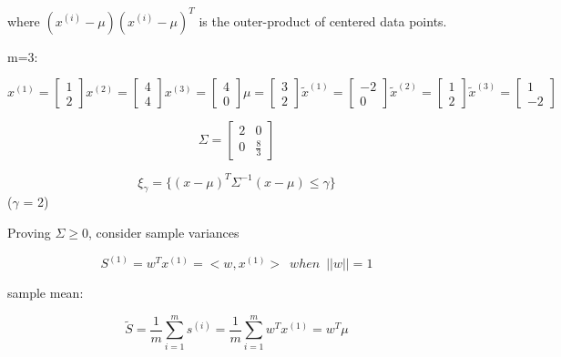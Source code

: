 where $(x^{(i)}-\mu)(x^{(i)}-\mu)^T$ is the outer-product of centered data points.

m=3:

$$x^{(1)} =
\left[
\begin{matrix}
1\\
2
\end{matrix}
\right]x^{(2)} =
\left[
\begin{matrix}
4\\
4
\end{matrix}
\right]x^{(3)} =
\left[
\begin{matrix}
4\\
0
\end{matrix}
\right]\mu =
\left[
\begin{matrix}
3\\
2
\end{matrix}
\right]\tilde{x}^{(1)} =
\left[
\begin{matrix}
-2\\
0
\end{matrix}
\right]\tilde{x}^{(2)} =
\left[
\begin{matrix}
1\\
2
\end{matrix}
\right]\tilde{x}^{(3)} =
\left[
\begin{matrix}
1\\
-2
\end{matrix}
\right]
$$



$$\Sigma = 
\left[
\begin{matrix}
2&0\\
0&\frac{8}{3}
\end{matrix}
\right]
$$

\begin{equation*}
\xi_{\gamma} = \{(x - \mu)^T \Sigma^{-1}(x - \mu)\leq \gamma \}
\end{equation*}
($\gamma$ = 2)

Proving $\Sigma\geq 0$, consider sample variances

\begin{equation*}
S^{(1)} =w^Tx^{(1)} = <w, x^{(1)}>\,\,\, when \,\,\, ||w|| = 1
\end{equation*}

sample mean:

\begin{equation*}
\tilde{S} = \frac{1}{m}\sum^m_{i=1}s^{(i)} = \frac{1}{m}\sum^m_{i=1}w^Tx^{(1)} = w^T\mu
\end{equation*}



